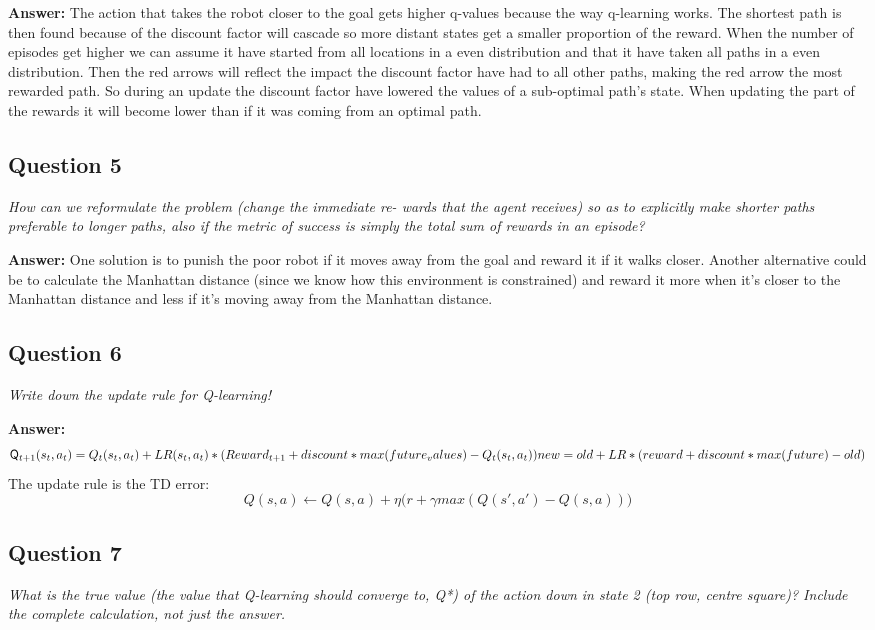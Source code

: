 \documentclass[a4paper]{article}
\begin{document}
\textbf{Answer:} The action that takes the robot closer to the goal gets higher q-values because the way q-learning works. The shortest path is then found because of the discount factor will cascade so more distant states get a smaller proportion of the reward. When the number of episodes get higher we can assume it have started from all locations in a even distribution and that it have taken all paths in a even distribution. Then the red arrows will reflect the impact the discount factor have had to all other paths, making the red arrow the most rewarded path.
So during an update the discount factor have lowered the values of a sub-optimal path's state. When updating the part of the rewards it will become lower than if it was coming from an optimal path. 

\subsection*{Question 5}
\emph{How can we reformulate the problem (change the immediate re-
wards that the agent receives) so as to explicitly make shorter paths preferable to longer paths, also if the metric of success is simply the total sum of rewards in an episode?}

\textbf{Answer:} One solution is to punish the poor robot if it moves away from the goal and reward it if it walks closer. 
Another alternative could be to calculate the Manhattan distance (since we know how this environment is constrained) and reward it more when it's closer to the Manhattan distance and less if it's moving away from the Manhattan distance.

\subsection*{Question 6}
\emph{Write down the update rule for Q-learning!}

\textbf{Answer:} 
\begin{equation*}
\mathsf{Q}_{t + 1}(s_t, a_t) = \\
Q_t(s_t, a_t) + LR(s_t, a_t) * 
( Reward_{t + 1} + discount * max(future_values) - Q_t(s_t, a_t) )
new = old + LR * (reward + discount * max(future) - old)
\end{equation*}
The update rule is the TD error:
\begin{equation*}
Q(s, a) \leftarrow Q(s, a) + \eta \bigg( r + \gamma max(Q(s', a') - Q(s, a)) \bigg)
\end{equation*}

\subsection*{Question 7}
\emph{What is the true value (the value that Q-learning should converge
to, Q*) of the action down in state 2 (top row, centre square)? Include the complete calculation, not just the answer.}
\end{document}
